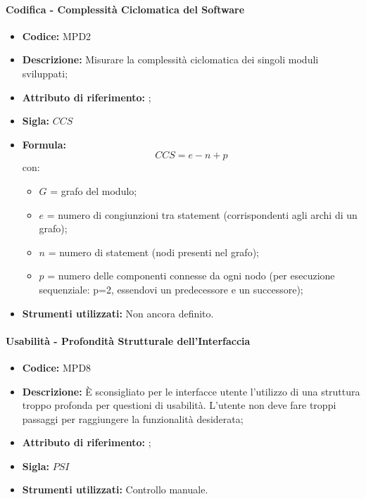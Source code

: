 \paragraph{Codifica - Complessità Ciclomatica del Software} 
    \begin{itemize}
    \item \textbf{Codice:} MPD2
    \item \textbf{Descrizione:} Misurare la complessità ciclomatica dei singoli moduli sviluppati;
    \item \textbf{Attributo di riferimento:} ;
    \item \textbf{Sigla:} $CCS$
    \item \textbf{Formula:} $$CCS = e - n + p$$
    con:
    \begin{itemize}
        \item $G$ = grafo del modulo;
        \item $e$ = numero di congiunzioni tra statement (corrispondenti agli archi di un grafo);
        \item $n$ = numero di statement (nodi presenti nel grafo);
        \item $p$ = numero delle componenti connesse da ogni nodo (per esecuzione sequenziale: p=2, essendovi un predecessore e un successore);
    \end{itemize}
    \item \textbf{Strumenti utilizzati:} Non ancora definito.
\end{itemize}

\paragraph{Usabilità - Profondità Strutturale dell'Interfaccia}
\begin{itemize}
    \item \textbf{Codice:} MPD8
    \item \textbf{Descrizione:} È sconsigliato per le interfacce utente l'utilizzo di una struttura troppo profonda per questioni di usabilità. L'utente non deve fare troppi passaggi per raggiungere la funzionalità desiderata;
    \item \textbf{Attributo di riferimento:} ;
    \item \textbf{Sigla:} $PSI$
    \item \textbf{Strumenti utilizzati:} Controllo manuale.
\end{itemize}

